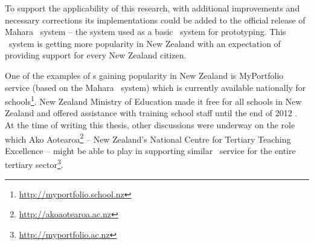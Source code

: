 To support the applicability of this research, with additional improvements
and necessary corrections its implementations could be added to the official
release of Mahara \ep~system -- the system used as a basic \ep~system for
prototyping. This \ep~system is getting more popularity in New Zealand with an
expectation of providing \LLLs support for every New Zealand citizen. 

One of the examples of \ep s gaining popularity in New Zealand is MyPortfolio
service (based on the Mahara \ep~system) which is currently available nationally
for schools\footnote{\url{http://myportfolio.school.nz}}. New Zealand Ministry
of Education made it free for all schools in New Zealand and offered assistance
with training school staff until the end of 2012
\citep{NewZealandMinistryofEducation2012}. At the time of writing this thesis,
other discussions were underway on the role which Ako
Aotearoa\footnote{\url{http://akoaotearoa.ac.nz}} -- New Zealand's National
Centre for Tertiary Teaching Excellence -- might be able to play in supporting
similar \ep~service for the entire tertiary
sector\footnote{\url{http://myportfolio.ac.nz}}.
